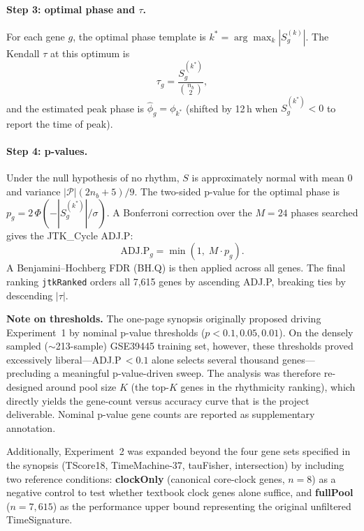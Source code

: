 \documentclass[10pt,a4paper]{article}
\begin{document}
\paragraph{Step 3: optimal phase and $\tau$.}
For each gene $g$, the optimal phase template is
$k^* = \arg\max_k |S_g^{(k)}|$.
The Kendall $\tau$ at this optimum is
\begin{equation}
  \tau_g = \frac{S_g^{(k^*)}}{\binom{n_b}{2}},
  \label{eq:tau}
\end{equation}
and the estimated peak phase is $\hat\phi_g = \phi_{k^*}$
(shifted by 12\,h when $S_g^{(k^*)} < 0$ to report the time of
peak).
 
\paragraph{Step 4: p-values.}
Under the null hypothesis of no rhythm, $S$ is approximately normal
with mean 0 and variance $|\mathcal{P}|(2n_b+5)/9$.
The two-sided p-value for the optimal phase is
$p_g = 2\,\Phi(-|S_g^{(k^*)}|/\sigma)$.
A Bonferroni correction over the $M = 24$ phases searched gives the
JTK\_Cycle ADJ.P:
\begin{equation}
  \text{ADJ.P}_g = \min(1,\; M \cdot p_g).
  \label{eq:adjp}
\end{equation}
A Benjamini--Hochberg FDR (BH.Q) is then applied across all genes.
The final ranking \texttt{jtkRanked} orders all 7,615 genes by
ascending ADJ.P, breaking ties by descending $|\tau|$.
 
\textbf{Note on thresholds.}
The one-page synopsis originally proposed driving Experiment~1 by
nominal p-value thresholds ($p < 0.1, 0.05, 0.01$).
On the densely sampled (${\sim}$213-sample) GSE39445 training set,
however, these thresholds proved excessively liberal---ADJ.P\,$< 0.1$
alone selects several thousand genes---precluding a meaningful
p-value-driven sweep.
The analysis was therefore re-designed around pool size $K$ (the
top-$K$ genes in the rhythmicity ranking), which directly yields
the gene-count versus accuracy curve that is the project deliverable.
Nominal p-value gene counts are reported as supplementary annotation.
 
Additionally, Experiment~2 was expanded beyond the four gene sets
specified in the synopsis (TScore18, TimeMachine-37, tauFisher,
intersection) by including two reference conditions: \textbf{clockOnly}
(canonical core-clock genes, $n = 8$) as a negative control to test
whether textbook clock genes alone suffice, and \textbf{fullPool}
($n = 7{,}615$) as the performance upper bound representing the
original unfiltered TimeSignature.
 
\end{document}
